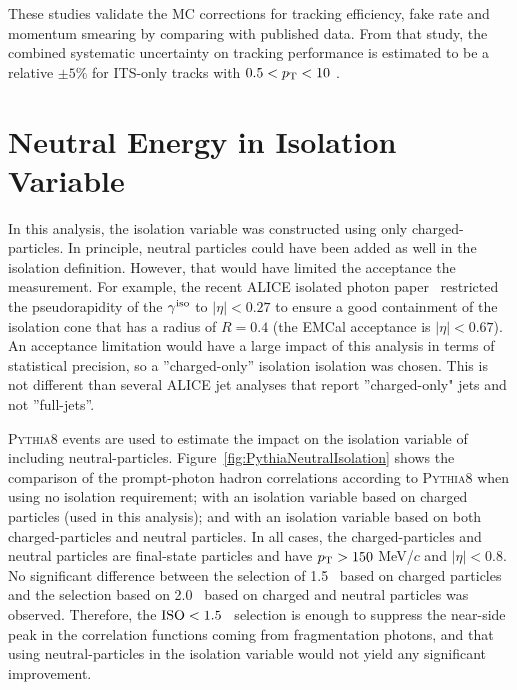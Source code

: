 These studies validate the MC corrections for tracking efficiency, fake rate and momentum smearing by comparing with published data. From that study, the combined systematic uncertainty on tracking performance is estimated to be a relative $\pm 5\%$ for ITS-only tracks with $0.5 < p_{\mathrm{T}} < 10$ \GeVc. 

\FloatBarrier
\section{Neutral Energy in Isolation Variable}

In this analysis, the isolation variable was constructed using only charged-particles. In principle, neutral particles could have been added as well in the isolation definition. However, that would have limited the acceptance the measurement. For example, the recent ALICE isolated photon paper~\cite{Acharya:2019jkx} restricted the pseudorapidity of the $\gamma^\mathrm{iso}$ to $|\eta|<0.27$ to ensure a good containment of the isolation cone that has a radius of $R=0.4$ (the EMCal acceptance is $|\eta|<0.67$). An acceptance limitation would have a large impact of this analysis in terms of statistical precision, so a ''charged-only'' isolation isolation was chosen. This is not different than several ALICE jet analyses that report ''charged-only" jets and not ''full-jets''. 

\textsc{Pythia8} events are used to estimate the impact on the isolation variable of including neutral-particles. Figure~\ref{fig:PythiaNeutralIsolation} shows the comparison of the prompt-photon hadron correlations according to \textsc{Pythia8} when using no isolation requirement; with an isolation variable based on charged particles (used in this analysis); and with an isolation variable based on both charged-particles and neutral particles. In all cases, the charged-particles and neutral particles are final-state particles and have $p_{\mathrm{T}}>150$ MeV/$c$ and $|\eta|<0.8$. No significant difference between the selection of 1.5 \GeVc~based on charged particles and the selection based on 2.0 \GeVc~based on charged and neutral particles was observed. Therefore, the $\mathrm{ISO}<1.5$ \GeVc~selection is enough to suppress the near-side peak in the correlation functions coming from fragmentation photons, and that using neutral-particles in the isolation variable would not yield any significant improvement.


